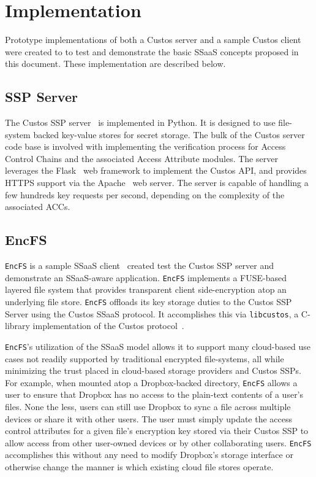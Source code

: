 \section{Implementation}

Prototype implementations of both a Custos server and a sample Custos
client were created to to test and demonstrate the basic SSaaS
concepts proposed in this document. These implementation are described
below.

\subsection{SSP Server}

The Custos SSP server~\cite{custos-repo-server} is implemented in
Python. It is designed to use file-system backed key-value stores for
secret storage. The bulk of the Custos server code base is involved
with implementing the verification process for Access Control Chains
and the associated Access Attribute modules. The server leverages the
Flask~\cite{python-flask} web framework to implement the Custos API,
and provides HTTPS support via the Apache~\cite{apache} web server.
The server is capable of handling a few hundreds key requests per
second, depending on the complexity of the associated ACCs.

\subsection{EncFS}

\texttt{EncFS} is a sample SSaaS client~\cite{custos-repo-encfs}
created test the Custos SSP server and demonstrate an SSaaS-aware
application. \texttt{EncFS} implements a FUSE-based~\cite{fuse}
layered file system that provides transparent client side-encryption
atop an underlying file store. \texttt{EncFS} offloads its key storage
duties to the Custos SSP Server using the Custos SSaaS protocol. It
accomplishes this via \texttt{libcustos}, a C-library implementation
of the Custos protocol~\cite{custos-repo-libcustos}.

\texttt{EncFS}'s utilization of the SSaaS model allows it to support
many cloud-based use cases not readily supported by traditional
encrypted file-systems, all while minimizing the trust placed in
cloud-based storage providers and Custos SSPs. For example, when
mounted atop a Dropbox-backed directory, \texttt{EncFS} allows a user
to ensure that Dropbox has no access to the plain-text contents of a
user's files. None the less, users can still use Dropbox to sync a
file across multiple devices or share it with other users. The user
must simply update the access control attributes for a given file's
encryption key stored via their Custos SSP to allow access from other
user-owned devices or by other collaborating users. \texttt{EncFS}
accomplishes this without any need to modify Dropbox's storage
interface or otherwise change the manner is which existing cloud file
stores operate.

